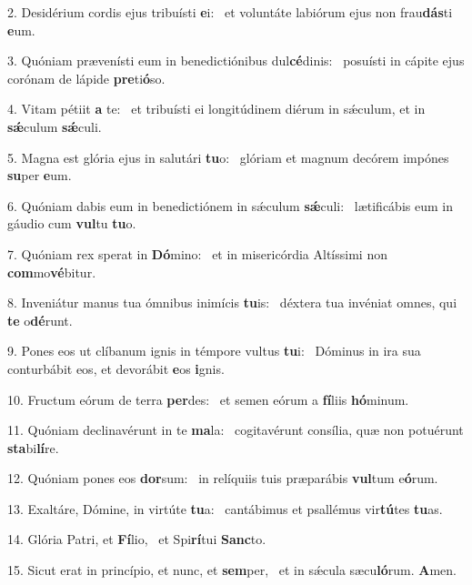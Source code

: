 2. Desidérium cordis ejus tribuísti \textbf{e}i: \ast\  et voluntáte labiórum ejus non frau\textbf{dás}ti \textbf{e}um.\

3. Quóniam prævenísti eum in benedictiónibus dul\textbf{cé}dinis: \ast\  posuísti in cápite ejus corónam de lápide \textbf{pre}ti\textbf{ó}so.\

4. Vitam pétiit \textbf{a} te: \ast\  et tribuísti ei longitúdinem diérum in sǽculum, et in \textbf{sǽ}culum \textbf{sǽ}culi.\

5. Magna est glória ejus in salutári \textbf{tu}o: \ast\  glóriam et magnum decórem impónes \textbf{su}per \textbf{e}um.\

6. Quóniam dabis eum in benedictiónem in sǽculum \textbf{sǽ}culi: \ast\  lætificábis eum in gáudio cum \textbf{vul}tu \textbf{tu}o.\

7. Quóniam rex sperat in \textbf{Dó}mino: \ast\  et in misericórdia Altíssimi non \textbf{com}mo\textbf{vé}bitur.\

8. Inveniátur manus tua ómnibus inimícis \textbf{tu}is: \ast\  déxtera tua invéniat omnes, qui \textbf{te} o\textbf{dé}runt.\

9. Pones eos ut clíbanum ignis in témpore vultus \textbf{tu}i: \ast\  Dóminus in ira sua conturbábit eos, et devorábit \textbf{e}os \textbf{i}gnis.\

10. Fructum eórum de terra \textbf{per}des: \ast\  et semen eórum a \textbf{fí}liis \textbf{hó}minum.\

11. Quóniam declinavérunt in te \textbf{ma}la: \ast\  cogitavérunt consília, quæ non potuérunt \textbf{sta}bi\textbf{lí}re.\

12. Quóniam pones eos \textbf{dor}sum: \ast\  in relíquiis tuis præparábis \textbf{vul}tum e\textbf{ó}rum.\

13. Exaltáre, Dómine, in virtúte \textbf{tu}a: \ast\  cantábimus et psallémus vir\textbf{tú}tes \textbf{tu}as.\

14. Glória Patri, et \textbf{Fí}lio, \ast\  et Spi\textbf{rí}tui \textbf{Sanc}to.\

15. Sicut erat in princípio, et nunc, et \textbf{sem}per, \ast\  et in sǽcula sæcu\textbf{ló}rum. \textbf{A}men.\


